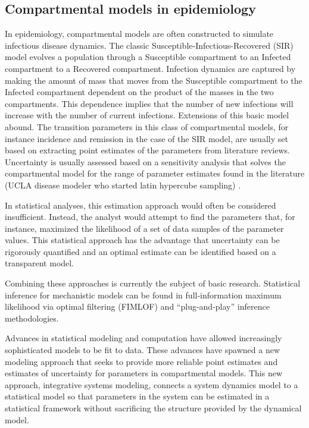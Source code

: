 \subsection{Compartmental models in epidemiology}
In epidemiology, compartmental models are often constructed to
simulate infectious disease dynamics.\cite{Anderson_Infectious_1991}
The classic Susceptible-Infectious-Recovered (SIR) model evolves a
population through a Susceptible compartment to an Infected
compartment to a Recovered
compartment.\cite{Kermack_Contribution_1927} Infection dynamics are
captured by making the amount of mass that moves from the Susceptible
compartment to the Infected compartment dependent on the product of
the masses in the two compartments. This dependence implies that the
number of new infections will increase with the number of current
infections. Extensions of this basic model abound.\cite{Daley_Epidemic_2001,Brauer_Mathematical_2001} The transition
parameters in this class of compartmental models, for instance incidence and
remission in the case of the SIR model, are usually set
based on extracting point estimates of the parameters from literature
reviews. Uncertainty is usually assessed based on a sensitivity
analysis that solves the compartmental model for the range of
parameter estimates found in the literature (UCLA disease modeler who
started latin hypercube sampling) \cite{Nagelkerke_Modelling_2002,
  Brandeau_Screening_1993, Broutin_Impact_2010}.

In statistical analyses, this estimation approach would often be
considered insufficient. Instead, the analyst would attempt to find the
parameters that, for instance, maximized the likelihood of a set of
data samples of the parameter values. This statistical approach has
the advantage that uncertainty can be rigorously quantified and an
optimal estimate can be identified based on a transparent model.

Combining these approaches is currently the subject of basic research.
Statistical inference for mechanistic models can be found in full-information maximum likelihood via optimal filtering (FIMLOF) and ``plug-and-play'' inference methodologies. \cite{peterson_statistical_1980, he_plug_2010, breto_time_2009}

Advances in statistical modeling and computation have allowed
increasingly sophisticated models to be fit to data. These advances
have spawned a new modeling approach that seeks to provide more
reliable point estimates and estimates of uncertainty for parameters
in compartmental models. This new approach, integrative systems
modeling, connects a system dynamics model to a statistical model so
that parameters in the system can be estimated in a statistical
framework without sacrificing the structure provided by the dynamical
model.

